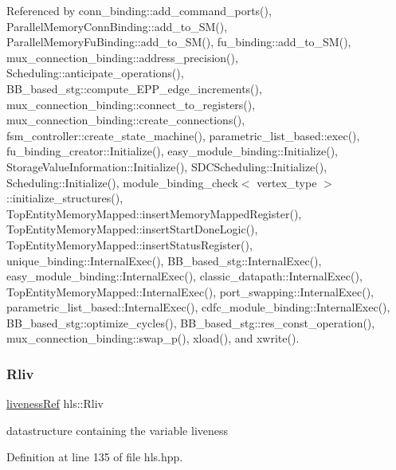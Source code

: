 Referenced by conn\+\_\+binding\+::add\+\_\+command\+\_\+ports(), Parallel\+Memory\+Conn\+Binding\+::add\+\_\+to\+\_\+\+S\+M(), Parallel\+Memory\+Fu\+Binding\+::add\+\_\+to\+\_\+\+S\+M(), fu\+\_\+binding\+::add\+\_\+to\+\_\+\+S\+M(), mux\+\_\+connection\+\_\+binding\+::address\+\_\+precision(), Scheduling\+::anticipate\+\_\+operations(), B\+B\+\_\+based\+\_\+stg\+::compute\+\_\+\+E\+P\+P\+\_\+edge\+\_\+increments(), mux\+\_\+connection\+\_\+binding\+::connect\+\_\+to\+\_\+registers(), mux\+\_\+connection\+\_\+binding\+::create\+\_\+connections(), fsm\+\_\+controller\+::create\+\_\+state\+\_\+machine(), parametric\+\_\+list\+\_\+based\+::exec(), fu\+\_\+binding\+\_\+creator\+::\+Initialize(), easy\+\_\+module\+\_\+binding\+::\+Initialize(), Storage\+Value\+Information\+::\+Initialize(), S\+D\+C\+Scheduling\+::\+Initialize(), Scheduling\+::\+Initialize(), module\+\_\+binding\+\_\+check$<$ vertex\+\_\+type $>$\+::initialize\+\_\+structures(), Top\+Entity\+Memory\+Mapped\+::insert\+Memory\+Mapped\+Register(), Top\+Entity\+Memory\+Mapped\+::insert\+Start\+Done\+Logic(), Top\+Entity\+Memory\+Mapped\+::insert\+Status\+Register(), unique\+\_\+binding\+::\+Internal\+Exec(), B\+B\+\_\+based\+\_\+stg\+::\+Internal\+Exec(), easy\+\_\+module\+\_\+binding\+::\+Internal\+Exec(), classic\+\_\+datapath\+::\+Internal\+Exec(), Top\+Entity\+Memory\+Mapped\+::\+Internal\+Exec(), port\+\_\+swapping\+::\+Internal\+Exec(), parametric\+\_\+list\+\_\+based\+::\+Internal\+Exec(), cdfc\+\_\+module\+\_\+binding\+::\+Internal\+Exec(), B\+B\+\_\+based\+\_\+stg\+::optimize\+\_\+cycles(), B\+B\+\_\+based\+\_\+stg\+::res\+\_\+const\+\_\+operation(), mux\+\_\+connection\+\_\+binding\+::swap\+\_\+p(), xload(), and xwrite().

\mbox{\label{classhls_a2b30e1faa6160eb82d63a10c8cfe2007}} 
\subsubsection{\texorpdfstring{Rliv}{Rliv}}
{\footnotesize\ttfamily \hyperlink{liveness_8hpp_ac56034a0c324ba3e860802f126f7793f}{liveness\+Ref} hls\+::\+Rliv}



datastructure containing the variable liveness 



Definition at line 135 of file hls.\+hpp.



